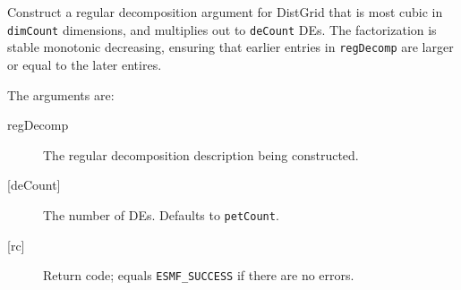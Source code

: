      Construct a regular decomposition argument for DistGrid that is most cubic
     in {\tt dimCount} dimensions, and multiplies out to {\tt deCount} DEs. The
     factorization is stable monotonic decreasing, ensuring that earlier entries
     in {\tt regDecomp} are larger or equal to the later entires.
  
     The arguments are:
     \begin{description}
     \item[regDecomp]
       The regular decomposition description being constructed.
     \item[{[deCount]}]
       The number of DEs. Defaults to {\tt petCount}.
     \item[{[rc]}]
       Return code; equals {\tt ESMF\_SUCCESS} if there are no errors.
     \end{description}
  
\setlength{\parskip}{\oldparskip}
\setlength{\parindent}{\oldparindent}
\setlength{\baselineskip}{\oldbaselineskip}
